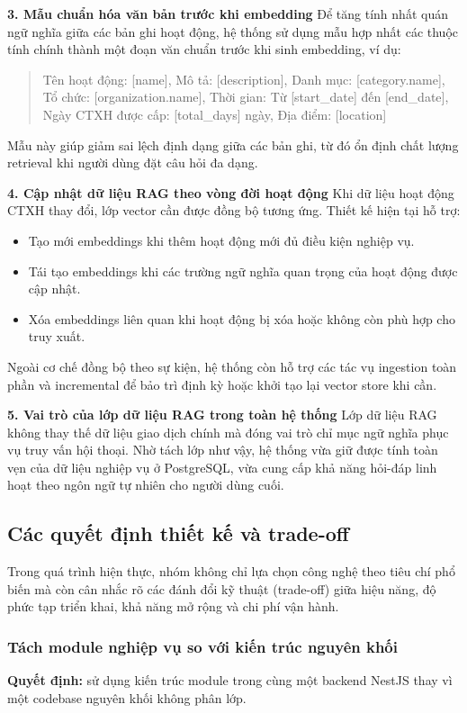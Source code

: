 \textbf{3. Mẫu chuẩn hóa văn bản trước khi embedding}
Để tăng tính nhất quán ngữ nghĩa giữa các bản ghi hoạt động, hệ thống sử dụng mẫu hợp nhất các thuộc tính chính thành một đoạn văn chuẩn trước khi sinh embedding, ví dụ:
\begin{quote}
Tên hoạt động: [name], Mô tả: [description], Danh mục: [category.name],\\
Tổ chức: [organization.name], Thời gian: Từ [start\_date] đến [end\_date],\\
Ngày CTXH được cấp: [total\_days] ngày, Địa điểm: [location]
\end{quote}
Mẫu này giúp giảm sai lệch định dạng giữa các bản ghi, từ đó ổn định chất lượng retrieval khi người dùng đặt câu hỏi đa dạng.

\textbf{4. Cập nhật dữ liệu RAG theo vòng đời hoạt động}
Khi dữ liệu hoạt động CTXH thay đổi, lớp vector cần được đồng bộ tương ứng. Thiết kế hiện tại hỗ trợ:
\begin{itemize}
	\item Tạo mới embeddings khi thêm hoạt động mới đủ điều kiện nghiệp vụ.
	\item Tái tạo embeddings khi các trường ngữ nghĩa quan trọng của hoạt động được cập nhật.
	\item Xóa embeddings liên quan khi hoạt động bị xóa hoặc không còn phù hợp cho truy xuất.
\end{itemize}
Ngoài cơ chế đồng bộ theo sự kiện, hệ thống còn hỗ trợ các tác vụ ingestion toàn phần và incremental để bảo trì định kỳ hoặc khởi tạo lại vector store khi cần.

\textbf{5. Vai trò của lớp dữ liệu RAG trong toàn hệ thống}
Lớp dữ liệu RAG không thay thế dữ liệu giao dịch chính mà đóng vai trò chỉ mục ngữ nghĩa phục vụ truy vấn hội thoại. Nhờ tách lớp như vậy, hệ thống vừa giữ được tính toàn vẹn của dữ liệu nghiệp vụ ở PostgreSQL, vừa cung cấp khả năng hỏi-đáp linh hoạt theo ngôn ngữ tự nhiên cho người dùng cuối.

\subsection{Các quyết định thiết kế và trade-off}
Trong quá trình hiện thực, nhóm không chỉ lựa chọn công nghệ theo tiêu chí phổ biến mà còn cân nhắc rõ các đánh đổi kỹ thuật (trade-off) giữa hiệu năng, độ phức tạp triển khai, khả năng mở rộng và chi phí vận hành.

\subsubsection{Tách module nghiệp vụ so với kiến trúc nguyên khối}
\textbf{Quyết định:} sử dụng kiến trúc module trong cùng một backend NestJS thay vì một codebase nguyên khối không phân lớp.

